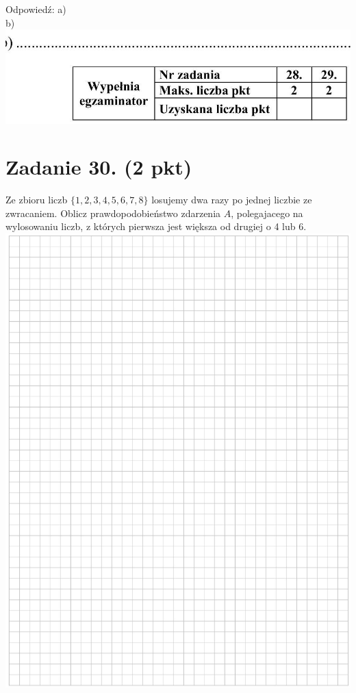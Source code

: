 \documentclass[10pt]{article}
\begin{document}
Odpowiedź: a)\\
b)\\
\includegraphics[max width=\textwidth, center]{2024_11_21_0c267759828927e3a26dg-13(1)}

\section*{Zadanie 30. (2 pkt)}
Ze zbioru liczb \(\{1,2,3,4,5,6,7,8\}\) losujemy dwa razy po jednej liczbie ze zwracaniem. Oblicz prawdopodobieństwo zdarzenia \(A\), polegajacego na wylosowaniu liczb, z których pierwsza jest większa od drugiej o 4 lub 6.\\
\includegraphics[max width=\textwidth, center]{2024_11_21_0c267759828927e3a26dg-14}
\end{document}
